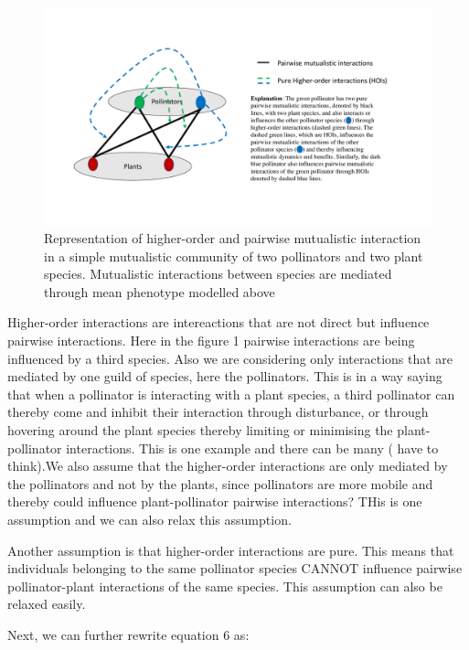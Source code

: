 \documentclass{elsarticle}
\begin{document}
\begin{figure}[!htb] 
\begin{center}
\includegraphics[width=15cm]{fig1.pdf}      
\end{center}
\caption{Representation of higher-order and pairwise mutualistic interaction in a simple mutualistic community of two pollinators and two plant species. Mutualistic interactions between species are mediated through mean phenotype modelled above}
\end{figure}


Higher-order interactions are intereactions that are not direct but influence pairwise interactions. Here in the figure 1 pairwise interactions are being influenced by a third species. Also we are considering only interactions that are mediated by one guild of species, here the pollinators. This is in a way saying that when a pollinator is interacting with a plant species, a third pollinator can thereby come and inhibit their interaction through disturbance, or through hovering around the plant species thereby limiting or minimising the plant-pollinator interactions. This is one example and there can be many ( have to think).We also assume that the higher-order interactions are only mediated by the pollinators and not by the plants, since pollinators are more mobile and thereby could influence plant-pollinator pairwise interactions? THis is one assumption and we can also relax this assumption.

Another assumption is that higher-order interactions are pure. This means that individuals belonging to the same pollinator species CANNOT influence pairwise pollinator-plant interactions of the same species. This assumption can also be relaxed easily. 

Next, we can further rewrite equation 6 as:
\end{document}
